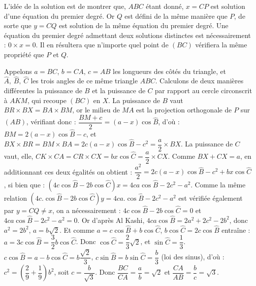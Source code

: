 \begin{sol}

\medskip

L'idée de la solution est de montrer que, $ABC$ étant donné, $x = CP$ est solution d'une équation du premier degré. Or $Q$ est défini de la même manière que $P$, de sorte que $y = CQ$ est solution de la même équation du premier degré. Une équation du premier degré admettant deux solutions distinctes est nécessairement : $0 \times x = 0$. Il en résultera que n'importe quel point de $(BC)$ vérifiera la même propriété que $P$ et $Q$. 

\smallskip

Appelons $a = BC$, $b = CA$, $c = AB$ les longueurs des côtés du triangle, et $\widehat{A}, \ \widehat{B}, \ \widehat{C}$ les trois angles de ce même triangle $ABC$. Calculons de deux manières différentes la puissance de $B$ et la puissance de $C$ par rapport au cercle circonscrit à $AKM$, qui recoupe $(BC)$ en $X$. La puissance de $B$ vaut $BR \times BX = BA \times BM$, or le milieu de $MA$ est la projection orthogonale de $P$ sur $(AB)$, vérifiant donc : $\dfrac{BM + c}{2} = (a-x)\cos \widehat{B}$, d'où : $BM = 2(a-x) \cos \widehat{B} - c$, et $BX \times BR = BM \times BA = 2c(a-x)\cos \widehat{B} - c^2 = \dfrac{a}{2} \times BX$. La puissance de $C$ vaut, elle, $CK \times CA = CR \times CX = bx \cos \widehat{C} = \dfrac{a}{2} \times CX$. Comme $BX + CX = a$, en additionnant ces deux égalités on obtient : $\dfrac{a^2}{2} = 2c(a-x) \cos \widehat{B} - c^2 + bx \cos \widehat{C}$, si bien que : $\left( 4c \cos \widehat{B} - 2b \cos \widehat{C} \right) x = 4ca \cos \widehat{B} - 2c^2 - a^2$.  Comme la même relation $\left( 4c.\cos \widehat{B} - 2b \cos \widehat{C} \right) y = 4ca.\cos \widehat{B} - 2c^2 - a^2$ est vérifiée également par $y = CQ \neq x$, on a nécessairement : $4c \cos \widehat{B} - 2b \cos \widehat{C} = 0$ et $4ca \cos \widehat{B} - 2c^2 - a^2 = 0$. Or d'après Al Kashi, $4ca \cos \widehat{B} = 2a^2 + 2c^2 - 2b^2$, donc $a^2 = 2b^2$, $a = b \sqrt2$. Et comme $a = c\cos\widehat{B} + b\cos\widehat{C}$, $b\cos\widehat{C} = 2c\cos\widehat{B}$ entraîne : $a = 3c\cos\widehat{B} = \dfrac32 b\cos\widehat{C}$. Donc $\cos\widehat{C} = \dfrac23 \sqrt2$, et $\sin\widehat{C} = \dfrac13$. $c \cos \widehat{B} = a - b\cos \widehat{C} = b \dfrac{\sqrt2}{3} $, $c \sin \widehat{B} = b \sin \widehat{C} = \dfrac{b}{3}$ (loi des sinus), d'où : $c^2 = \left( \dfrac29 + \dfrac19 \right) b^2$, soit $c = \dfrac{b}{\sqrt3}$. Donc $\dfrac{BC}{CA} = \dfrac{a}{b} = \sqrt2$ et $\dfrac{CA}{AB} = \dfrac{b}{c} = \sqrt3$. 


\end{sol}

